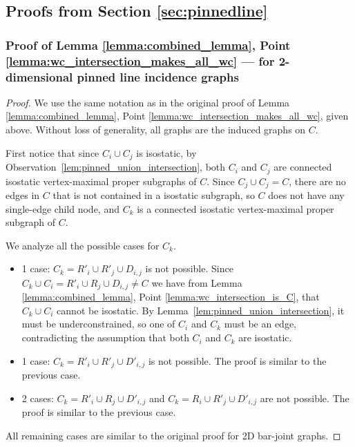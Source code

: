 



\subsection{Proofs from Section \ref{sec:pinnedline}}
\subsubsection{Proof of Lemma \ref{lemma:combined_lemma}, Point \ref{lemma:wc_intersection_makes_all_wc} --- for 2-dimensional pinned line incidence graphs}
\label{sec:appendix_pinned}

\begin{proof} %
We use the same notation as in the original proof of  Lemma \ref{lemma:combined_lemma}, Point \ref{lemma:wc_intersection_makes_all_wc}, given above.
Without loss of generality, all graphs are the induced graphs on $C$.

First notice that since $C_i \cup C_j$ is isostatic, by Observation~\ref{lem:pinned_union_intersection}, both $C_i$ and $C_j$ are connected isostatic vertex-maximal proper subgraphs of  $C$. Since $C_j \cup C_j = C$, there are no edges in $C$ that is not contained in a isostatic subgraph, so $C$ does not have any single-edge child node, and $C_k$ is a connected isostatic vertex-maximal proper subgraph of  $C$.


\newcommand{\inducedOnC}[1]{#1}

We analyze all the possible cases for $C_k$.
\begin{itemize}
    \item 1 case: $C_k=\inducedOnC{R'_i\cup R'_j\cup D_{i,j}}$ is not possible. Since $C_k\cup C_i = \inducedOnC{R'_i\cup R_j\cup D_{i,j}}\neq C$ we have from Lemma \ref{lemma:combined_lemma}, Point \ref{lemma:wc_intersection_is_C}, that $C_k\cup C_i$ cannot be isostatic.
    By Lemma~\ref{lem:pinned_union_intersection}, it must be underconstrained,
    so one of $C_i$ and $C_k$ must be an edge, contradicting the assumption that both $C_i$ and $C_k$ are isostatic.

    \item 1 case: $C_k=\inducedOnC{R'_i\cup R'_j\cup D'_{i,j}}$ is not possible. The proof is similar to the previous case.

    \item 2 cases: $C_k=\inducedOnC{R'_i\cup R_j\cup D'_{i,j}}$ and $C_k=\inducedOnC{R_i\cup R'_j\cup D'_{i,j}}$ are not possible.
    The proof is similar to the previous case.
\end{itemize}

All remaining cases are similar to the original proof for 2D bar-joint graphs.
\end{proof}

